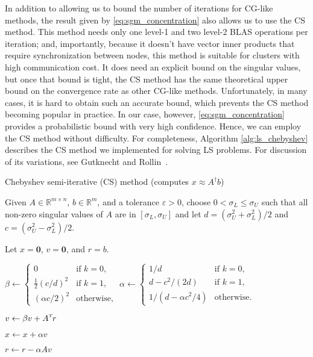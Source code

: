 \documentclass{siamltex}
\newcommand{\T}{^{\raisebox{0.09em}{\hbox{\tiny $T$}}\hspace{-0.1em}}}
\begin{document}
In addition to allowing us to bound the number of iterations for CG-like
methods, the result given by \eqref{eq:sgm_concentration} also allows us to use
the CS method.  This method needs only one level-1
and two level-2 BLAS operations per iteration; and, importantly, because it
doesn't have vector inner products that require synchronization between nodes,
this method is suitable for clusters with high communication cost. It does need
an explicit bound on the singular values, but once that bound is tight, the CS
method has the same theoretical upper bound on the convergence rate as other
CG-like methods.  Unfortunately, in many cases, it is hard to obtain such an
accurate bound, which prevents the CS method becoming popular in practice.  In
our case, however, \eqref{eq:sgm_concentration} provides a probabilistic bound
with very high confidence.  Hence, we can employ the CS method without
difficulty.  For completeness, Algorithm \ref{alg:ls_chebyshev} describes the CS
method we implemented for solving LS problems.  For discussion of its
variations, see Gutknecht and Rollin~\cite{gutknecht2002chebyshev}.
\begin{algorithm}[h]
  \caption{Chebyshev semi-iterative (CS) method (computes $x \approx A^\dagger
    b$)}
  \label{alg:ls_chebyshev}
  \begin{algorithmic}[1]
    \STATE Given $A \in \mathbb{R}^{m \times n}$, $b \in \mathbb{R}^{m}$, and a
    tolerance $\varepsilon > 0$, choose $0 < \sigma_L \leq \sigma_U$ such that all
    non-zero singular values of $A$ are in $[\sigma_L, \sigma_U]$ and let $d =
    (\sigma_U^2+\sigma_L^2)/2$ and $c = (\sigma_U^2-\sigma_L^2)/2$.

    \STATE Let $x = \mathbf{0}$, $v = \mathbf{0}$, and $r = b$.


    \STATE $\beta \leftarrow
    \begin{cases}
      0 & \text{if } k = 0, \\
      \frac{1}{2} (c/d)^2 & \text{if } k = 1, \\
      (\alpha c/2)^2 & \text{otherwise,}
    \end{cases}$ 
    \quad 
    $\alpha \leftarrow
    \begin{cases}
      1/d & \text{if } k = 0, \\
      d-c^2/(2d) & \text{if } k = 1, \\
      1 / ( d - \alpha c^2 / 4 ) & \text{otherwise}.
    \end{cases}$

    \STATE $v \leftarrow \beta v + A\T r$

    \STATE $x \leftarrow x + \alpha v$

    \STATE $r \leftarrow r - \alpha A v$

    \ENDFOR
  \end{algorithmic}
\end{algorithm}
\end{document}
